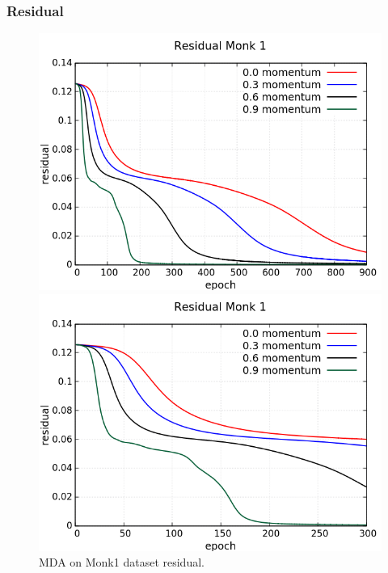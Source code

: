 \subsubsection{Residual}
\begin{figure}[H]
	\centering
	\begin{minipage}[t]{0.5\linewidth}
		\includegraphics[width=\linewidth]{data/MGD/Monk1/M/Monk1_MGD_Residual_standard.png}
	\end{minipage}%
	\begin{minipage}[t]{0.5\linewidth}
		\includegraphics[width=\linewidth]{data/MGD/Monk1/M/Monk1_MGD_Residual_zoom.png}
	\end{minipage}
	\caption{MDA on Monk1 dataset residual.}
\end{figure}


\newpage